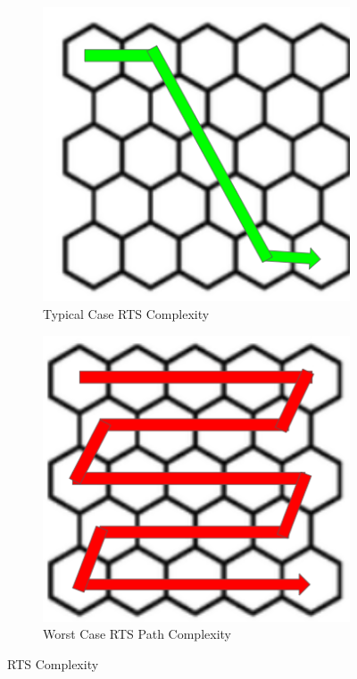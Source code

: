 \begin{figure}[htbp]\label{fig:rts_complexity}
  \centering
  \begin{subfigure}[b]{0.48\textwidth}
    \includegraphics[width=\textwidth]{figs/Thomas/Return To Safety/real_case_complexity.png}
    \caption{Typical Case RTS Complexity}
    \label{fig:typical_case}
  \end{subfigure}
  \hfill
  \begin{subfigure}[b]{0.48\textwidth}
    \includegraphics[width=\textwidth]{figs/Thomas/Return To Safety/worst_case_complexity.png}
    \caption{Worst Case RTS Path Complexity}
    \label{fig:worst_case}
\end{subfigure}

\caption{RTS Complexity}
\end{figure}